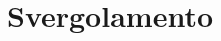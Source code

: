 \documentclass[a4paper, 15pt]{article}
\begin{document}
%

\newpage

\section{Svergolamento}



\end{document}
